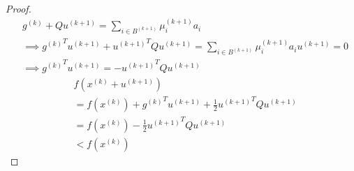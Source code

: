 \begin{proof}
\begin{align*}
& g^{(k)} + Qu^{(k+1)} = \sum_{i \in B^{(k+1)}} \mu_i^{(k+1)}a_i
\\ &\implies {g^{(k)}}^Tu^{(k+1)} + {u^{(k+1)}}^TQu^{(k+1)} = \sum_{i \in B^{(k+1)}} \mu_i^{(k+1)}a_iu^{(k+1)} = 0
\\ &\implies {g^{(k)}}^Tu^{(k+1)} = - {u^{(k+1)}}^TQu^{(k+1)}
\end{align*}
\begin{align*}
& f(x^{(k)} + u^{(k+1)})
\\ &= f(x^{(k)}) + {g^{(k)}}^Tu^{(k+1)} + \frac{1}{2}{u^{(k+1)}}^TQu^{(k+1)} \tag{Taylor series}
\\ &= f(x^{(k)}) - \frac{1}{2}{u^{(k+1)}}^TQu^{(k+1)}
\\ &< f(x^{(k)}) \tag{$Q$ is PD}
\end{align*}
\end{proof}


